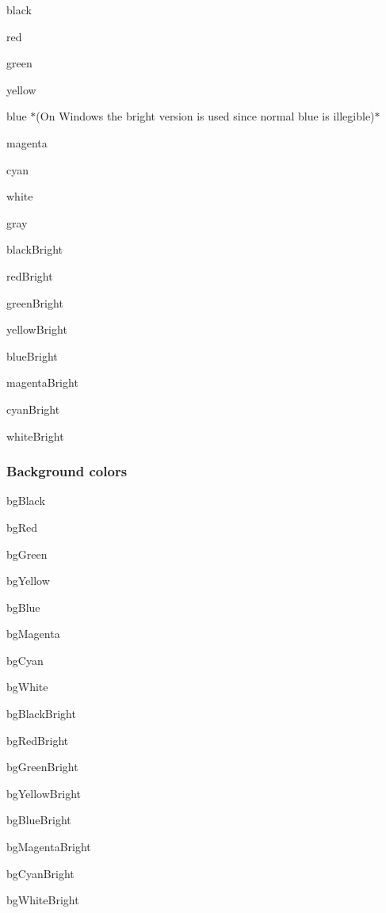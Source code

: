 \begin{DoxyItemize}
\item {\ttfamily black}
\item {\ttfamily red}
\item {\ttfamily green}
\item {\ttfamily yellow}
\item {\ttfamily blue} $\ast$(On Windows the bright version is used since normal blue is illegible)$\ast$
\item {\ttfamily magenta}
\item {\ttfamily cyan}
\item {\ttfamily white}
\item {\ttfamily gray}
\item {\ttfamily black\+Bright}
\item {\ttfamily red\+Bright}
\item {\ttfamily green\+Bright}
\item {\ttfamily yellow\+Bright}
\item {\ttfamily blue\+Bright}
\item {\ttfamily magenta\+Bright}
\item {\ttfamily cyan\+Bright}
\item {\ttfamily white\+Bright}
\end{DoxyItemize}

\subsubsection*{Background colors}


\begin{DoxyItemize}
\item {\ttfamily bg\+Black}
\item {\ttfamily bg\+Red}
\item {\ttfamily bg\+Green}
\item {\ttfamily bg\+Yellow}
\item {\ttfamily bg\+Blue}
\item {\ttfamily bg\+Magenta}
\item {\ttfamily bg\+Cyan}
\item {\ttfamily bg\+White}
\item {\ttfamily bg\+Black\+Bright}
\item {\ttfamily bg\+Red\+Bright}
\item {\ttfamily bg\+Green\+Bright}
\item {\ttfamily bg\+Yellow\+Bright}
\item {\ttfamily bg\+Blue\+Bright}
\item {\ttfamily bg\+Magenta\+Bright}
\item {\ttfamily bg\+Cyan\+Bright}
\item {\ttfamily bg\+White\+Bright}
\end{DoxyItemize}

